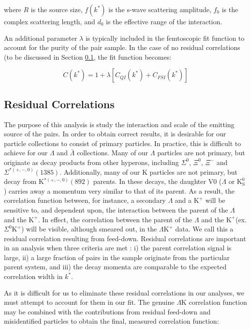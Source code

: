 \documentclass[ALICE,manyauthors]{cernphprep}
\newcommand{\kstar}{$k^{*}$\xspace}
\newcommand{\Lam}{$\Lambda$\xspace}
\newcommand{\ALam}{$\bar{\Lambda}$\xspace}
\newcommand{\KchP}{$\mathrm{K^{+}}$\xspace}
\newcommand{\Ks}{$\mathrm{K^{0}_{S}}$\xspace}
\newcommand{\LamK}{$\Lambda$K\xspace}
\newcommand{\LamKchP}{$\Lambda\mathrm{K^{+}}$\xspace}
\begin{document}
where $R$ is the source size, $f(k^{*})$ is the s-wave scattering amplitude, $f_{0}$ is the complex scattering length, and $d_{0}$ is the effective range of the interaction.

An additional parameter $\lambda$ is typically included in the femtoscopic fit function to account for the purity of the pair sample.  
In the case of no residual correlations (to be discussed in Section \ref{ResidualCorrelations}, the fit function becomes:

\begin{equation}
 C(k^{*}) = 1 + \lambda[C_{QI}(k^{*}) + C_{FSI}(k^{*})]
\label{eqn:LednickyEqnwLambda}
\end{equation}


\subsection{Residual Correlations}
\label{ResidualCorrelations}

The purpose of this analysis is study the interaction and scale of the emitting source of the pairs.
In order to obtain correct results, it is desirable for our particle collections to consist of primary particles.
In practice, this is difficult to achieve for our \Lam and \ALam collections.
Many of our \Lam particles are not primary, but originate as decay products from other hyperons, including $\Sigma^{0}$, $\Xi^{0}$, $\Xi^{-}$ and $\Sigma^{*(+,-,0)}(1385)$.  
Additionally, many of our K particles are not primary, but decay from K$^{*(+,-,0)}(892)$ parents.
In these decays, the daughter V0 (\Lam or \Ks) carries away a momentum very similar to that of its parent.
As a result, the correlation function between, for instance, a secondary \Lam and a \KchP  will be sensitive to, and dependent upon, the interaction between the parent of the \Lam and the \KchP.
In effect, the correlation between the parent of the \Lam and the \KchP (ex. $\Sigma^{0}$\KchP) will be visible, although smeared out, in the \LamKchP data.
We call this a residual correlation resulting from feed-down.  
Residual correlations are important in an analysis when three criteria are met \cite{Kisiel:2014mma}: i) the parent correlation signal is large, ii) a large fraction of pairs in the sample originate from the particular parent system, and iii) the decay momenta are comparable to the expected correlation width in \kstar. 

As it is difficult for us to eliminate these residual correlations in our analyses, we must attempt to account for them in our fit.
The genuine \LamK correlation function may be combined with the contributions from residual feed-down and misidentified particles to obtain the final, measured correlation function:
\end{document}
